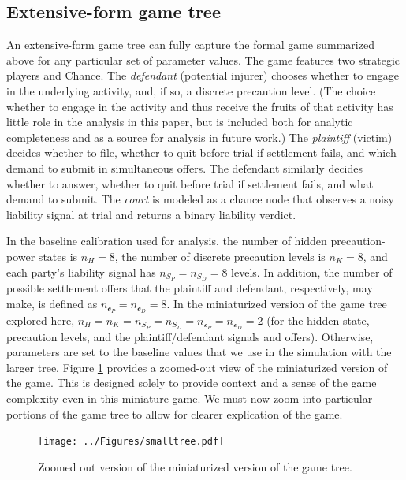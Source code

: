\documentclass{article}
\begin{document}
\subsection{Extensive-form game tree}

An extensive-form game tree can fully capture the formal game summarized above for any particular set of parameter values. The game features two strategic players and Chance. The \emph{defendant} (potential injurer) chooses whether to engage in the underlying activity, and, if so, a discrete precaution level. (The choice whether to engage in the activity and thus receive the fruits of that activity has little role in the analysis in this paper, but is included both for analytic completeness and as a source for analysis in future work.) The \emph{plaintiff} (victim) decides whether to file, whether to quit before trial if settlement fails, and which demand to submit in simultaneous offers. The defendant similarly decides whether to answer, whether to quit before trial if settlement fails, and what demand to submit. The \emph{court} is modeled as a chance node that observes a noisy liability signal at trial and returns a binary liability verdict.

In the baseline calibration used for analysis, the number of hidden precaution-power states is $n_H=8$, the number of discrete precaution levels is $n_K=8$, and each party’s liability signal has $n_{S_P}=n_{S_D}=8$ levels. In addition, the number of possible settlement offers that the plaintiff and defendant, respectively, may make, is defined as $n_{\mathcal{o}_P} = n_{\mathcal{o}_D} = 8$. In the miniaturized version of the game tree explored here, $n_H = n_K = n_{S_P} = n_{S_D} = n_{\mathcal{o}_P} = n_{\mathcal{o}_D} = 2$ (for the hidden state, precaution levels, and the plaintiff/defendant signals and offers). Otherwise, parameters are set to the baseline values that we use in the simulation with the larger tree. Figure \ref{fig:smalltree} provides a zoomed-out view of the miniaturized version of the game. This is designed solely to provide context and a sense of the game complexity even in this miniature game. We must now zoom into particular portions of the game tree to allow for clearer explication of the game.

 \begin{figure}[t]
  \centering
  \texttt{[image: ../Figures/smalltree.pdf]}
  \caption{Zoomed out version of the miniaturized version of the game tree.}
  \label{fig:smalltree}
\end{figure}
\end{document}

